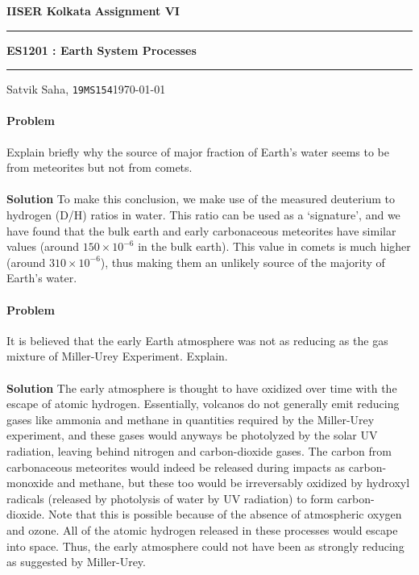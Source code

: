\documentclass[10pt]{article}
\newcounter{prob}
\def\problem{\stepcounter{prob}\paragraph{Problem \arabic{prob}}}
\def\solution{\\\\\textbf{Solution }}
\begin{document}
        \par\textbf{IISER Kolkata} \hfill \textbf{Assignment VI}
        \vspace{3pt}
        \hrule
        \vspace{3pt}
        \begin{center}
                \LARGE{\textbf{ES1201 : Earth System Processes}}
        \end{center}
        \vspace{3pt}
        \hrule
        \vspace{3pt}
        Satvik Saha, \texttt{19MS154}\hfill\today
        \vspace{20pt}

        \problem Explain briefly why the source of major fraction of Earth's water seems to be from meteorites but not from comets.
        \solution To make this conclusion, we make use of the measured deuterium to hydrogen (D/H) ratios in water.
        This ratio can be used as a `signature', and we have found that the bulk earth and early carbonaceous meteorites have
        similar values (around $150\times 10^{-6}$ in the bulk earth). This value in comets is much higher (around $310\times 10^{-6}$),
        thus making them an unlikely source of the majority of Earth's water.

        \problem It is believed that the early Earth atmosphere was not as reducing as the gas mixture of Miller-Urey Experiment. Explain.
        \solution The early atmosphere is thought to have oxidized over time with the escape of atomic hydrogen. Essentially,
        volcanos do not generally emit reducing gases like ammonia and methane in quantities required by the Miller-Urey experiment,
        and these gases would anyways be photolyzed by the solar UV radiation, leaving behind nitrogen and carbon-dioxide gases.
        The carbon from carbonaceous meteorites would indeed be released during impacts as carbon-monoxide and methane, but these too
        would be irreversably oxidized by hydroxyl radicals (released by photolysis of water by UV radiation) to form carbon-dioxide.
        Note that this is possible because of the absence of atmospheric oxygen and ozone. All of the atomic hydrogen released in
        these processes would escape into space. Thus, the early atmosphere could not have been as strongly reducing as suggested by
        Miller-Urey.
\end{document}
